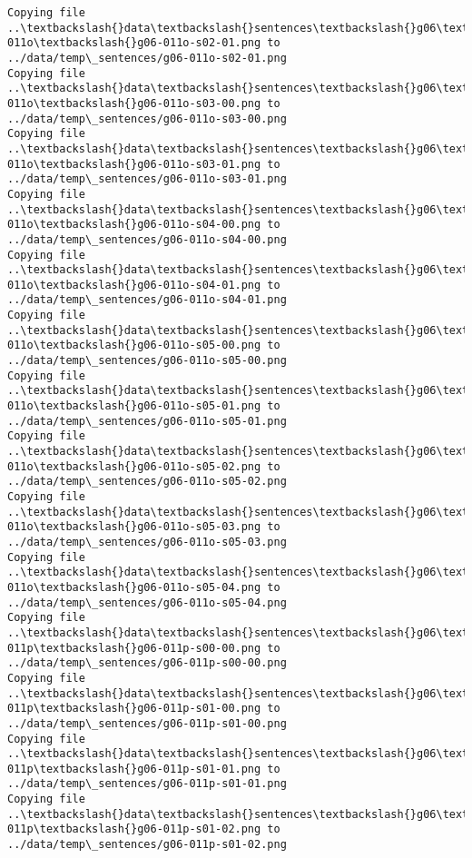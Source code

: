 \documentclass[11pt]{article}
\begin{document}
\begin{Verbatim}[commandchars=\\\{\}]
Copying file ..\textbackslash{}data\textbackslash{}sentences\textbackslash{}g06\textbackslash{}g06-011o\textbackslash{}g06-011o-s02-01.png to
../data/temp\_sentences/g06-011o-s02-01.png
Copying file ..\textbackslash{}data\textbackslash{}sentences\textbackslash{}g06\textbackslash{}g06-011o\textbackslash{}g06-011o-s03-00.png to
../data/temp\_sentences/g06-011o-s03-00.png
Copying file ..\textbackslash{}data\textbackslash{}sentences\textbackslash{}g06\textbackslash{}g06-011o\textbackslash{}g06-011o-s03-01.png to
../data/temp\_sentences/g06-011o-s03-01.png
Copying file ..\textbackslash{}data\textbackslash{}sentences\textbackslash{}g06\textbackslash{}g06-011o\textbackslash{}g06-011o-s04-00.png to
../data/temp\_sentences/g06-011o-s04-00.png
Copying file ..\textbackslash{}data\textbackslash{}sentences\textbackslash{}g06\textbackslash{}g06-011o\textbackslash{}g06-011o-s04-01.png to
../data/temp\_sentences/g06-011o-s04-01.png
Copying file ..\textbackslash{}data\textbackslash{}sentences\textbackslash{}g06\textbackslash{}g06-011o\textbackslash{}g06-011o-s05-00.png to
../data/temp\_sentences/g06-011o-s05-00.png
Copying file ..\textbackslash{}data\textbackslash{}sentences\textbackslash{}g06\textbackslash{}g06-011o\textbackslash{}g06-011o-s05-01.png to
../data/temp\_sentences/g06-011o-s05-01.png
Copying file ..\textbackslash{}data\textbackslash{}sentences\textbackslash{}g06\textbackslash{}g06-011o\textbackslash{}g06-011o-s05-02.png to
../data/temp\_sentences/g06-011o-s05-02.png
Copying file ..\textbackslash{}data\textbackslash{}sentences\textbackslash{}g06\textbackslash{}g06-011o\textbackslash{}g06-011o-s05-03.png to
../data/temp\_sentences/g06-011o-s05-03.png
Copying file ..\textbackslash{}data\textbackslash{}sentences\textbackslash{}g06\textbackslash{}g06-011o\textbackslash{}g06-011o-s05-04.png to
../data/temp\_sentences/g06-011o-s05-04.png
Copying file ..\textbackslash{}data\textbackslash{}sentences\textbackslash{}g06\textbackslash{}g06-011p\textbackslash{}g06-011p-s00-00.png to
../data/temp\_sentences/g06-011p-s00-00.png
Copying file ..\textbackslash{}data\textbackslash{}sentences\textbackslash{}g06\textbackslash{}g06-011p\textbackslash{}g06-011p-s01-00.png to
../data/temp\_sentences/g06-011p-s01-00.png
Copying file ..\textbackslash{}data\textbackslash{}sentences\textbackslash{}g06\textbackslash{}g06-011p\textbackslash{}g06-011p-s01-01.png to
../data/temp\_sentences/g06-011p-s01-01.png
Copying file ..\textbackslash{}data\textbackslash{}sentences\textbackslash{}g06\textbackslash{}g06-011p\textbackslash{}g06-011p-s01-02.png to
../data/temp\_sentences/g06-011p-s01-02.png

\end{Verbatim}
\end{document}
